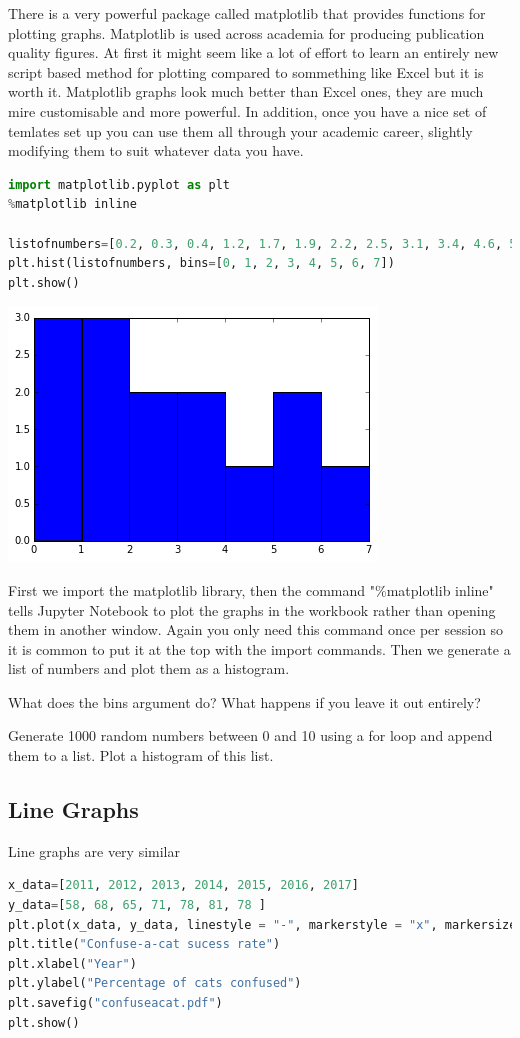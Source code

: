 		There is a very powerful package called matplotlib that provides functions for plotting graphs. Matplotlib is used across academia for producing publication quality figures. At first it might seem like a lot of effort to learn an entirely new script based method for plotting compared to sommething like Excel but it is worth it. Matplotlib graphs look much better than Excel ones, they are much mire customisable and more powerful. In addition, once you have a nice set of temlates set up you can use them all through your academic career, slightly modifying them to suit whatever data you have.
		\begin{lstlisting}[language=Python]
import matplotlib.pyplot as plt
%matplotlib inline

listofnumbers=[0.2, 0.3, 0.4, 1.2, 1.7, 1.9, 2.2, 2.5, 3.1, 3.4, 4.6, 5.1, 5.6, 6.0, 7.4, 7.4, 7.6]
plt.hist(listofnumbers, bins=[0, 1, 2, 3, 4, 5, 6, 7])
plt.show()\end{lstlisting}
		\includegraphics[scale=0.5]{images/histogram}

		First we import the matplotlib library, then the command "\%matplotlib inline" tells Jupyter Notebook to plot the graphs in the workbook rather than opening them in another window. Again you only need this command once per session so it is common to put it at the top with the import commands. Then we generate a list of numbers and plot them as a histogram.
		\begin{task}What does the bins argument do? What happens if you leave it out entirely?\end{task}
		\begin{task}Generate 1000 random numbers between 0 and 10 using a for loop and append them to a list. Plot a histogram of this list.\end{task}

	\subsection{Line Graphs}
		Line graphs are very similar
		\begin{lstlisting}[language=Python]
x_data=[2011, 2012, 2013, 2014, 2015, 2016, 2017]
y_data=[58, 68, 65, 71, 78, 81, 78 ]
plt.plot(x_data, y_data, linestyle = "-", markerstyle = "x", markersize=10, linewidth=2)
plt.title("Confuse-a-cat sucess rate")
plt.xlabel("Year")
plt.ylabel("Percentage of cats confused")
plt.savefig("confuseacat.pdf")
plt.show()\end{lstlisting}

